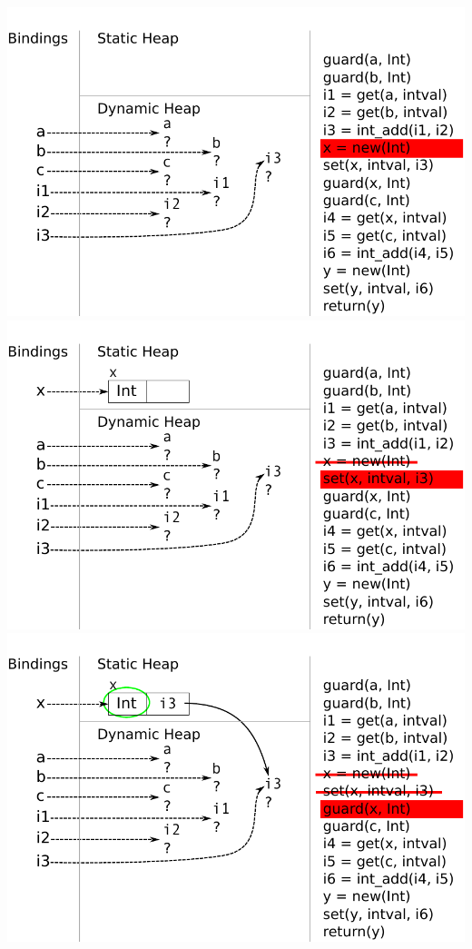 \documentclass[utf8x]{beamer}
\begin{document}
\begin{frame}[plain]
{\includegraphics[scale=0.8]{figures/ex06}}
{\includegraphics[scale=0.8]{figures/ex07}}
{\includegraphics[scale=0.8]{figures/ex08}}

\end{frame}
\end{document}
